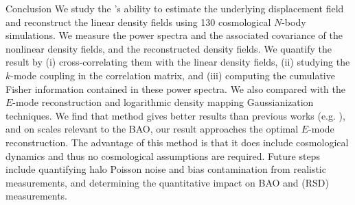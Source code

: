 \begin{section}{Conclusion}
  \label{sec:conclusion}
  We study the 's ability to estimate the underlying displacement 
  field and reconstruct the linear density fields using 130 cosmological $N$-body 
  simulations.  We measure the power spectra and the associated covariance of the 
  nonlinear density fields, and the reconstructed density fields.  We quantify the 
  result by (i) cross-correlating them with the linear density fields, (ii) studying 
  the $k$-mode coupling in the correlation matrix, and (iii) computing the cumulative 
  Fisher information contained in these power spectra.  We also
  compared with the $E$-mode 
  reconstruction and logarithmic density mapping Gaussianization
  techniques.
  We find that  method gives better results than previous works
  (e.g. \citealt{bib:Mark2009,bib:Zhang2011,bib:HarnoisD2013}), and on scales 
  relevant to the BAO, our result approaches the optimal $E$-mode reconstruction.  
  The advantage of this method is that it does  include cosmological dynamics and thus 
  no cosmological assumptions are required.
  Future steps include quantifying halo Poisson noise and bias contamination 
  from realistic measurements, and determining the quantitative impact on
  BAO and  (RSD) measurements.  

\end{section}
